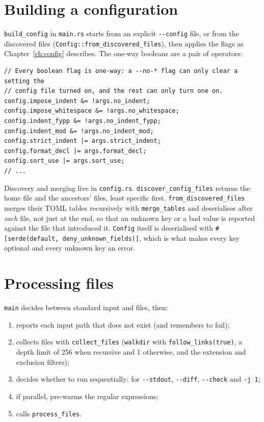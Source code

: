 \documentclass[11pt,a4paper,openany]{book}
\newcommand{\code}[1]{\texttt{\small #1}}
\newcommand{\file}[1]{\texttt{\small\color{accent}#1}}
\newcommand{\flag}[1]{\texttt{\small -{}-#1}}
\begin{document}
\section{Building a configuration}

\code{build\_config} in \file{main.rs} starts from an explicit
\flag{config} file, or from the discovered files
(\code{Config::from\_discovered\_files}), then applies
the flags as Chapter~\ref{ch:config} describes. The one-way booleans are a
pair of operators:

\begin{lstlisting}[style=rust]
// Every boolean flag is one-way: a --no-* flag can only clear a setting the
// config file turned on, and the rest can only turn one on.
config.impose_indent &= !args.no_indent;
config.impose_whitespace &= !args.no_whitespace;
config.indent_fypp &= !args.no_indent_fypp;
config.indent_mod &= !args.no_indent_mod;
config.strict_indent |= args.strict_indent;
config.format_decl |= args.format_decl;
config.sort_use |= args.sort_use;
// ...
\end{lstlisting}

Discovery and merging live in \file{config.rs}.
\code{discover\_config\_files} returns the home file and the ancestors' files,
least specific first. \code{from\_discovered\_files} merges their TOML tables
recursively with \code{merge\_tables} and deserialises after \emph{each} file,
not just at the end, so that an unknown key or a bad value is reported against
the file that introduced it. \code{Config} itself is deserialised with
\code{\#[serde(default, deny\_unknown\_fields)]}, which is what makes every key
optional and every unknown key an error.

\section{Processing files}

\code{main} decides between standard input and files, then:

\begin{enumerate}
  \item reports each input path that does not exist (and remembers to fail);
  \item collects files with \code{collect\_files} (\code{walkdir} with
    \code{follow\_links(true)}, a depth limit of 256 when recursive and 1
    otherwise, and the extension and exclusion filters);
  \item decides whether to run sequentially: for \flag{stdout}, \flag{diff},
    \flag{check} and \code{-j 1};
  \item if parallel, pre-warms the regular expressions;
  \item calls \code{process\_files}.
\end{enumerate}
\end{document}
